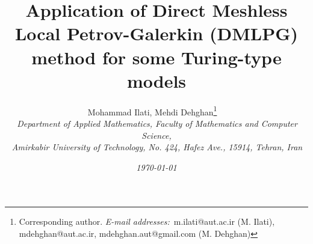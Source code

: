 \documentclass[12pt]{article}
\numberwithin{equation}{section}
\begin{document}
\date{\small\textsl{\today}}
\title{Application of Direct Meshless Local Petrov-Galerkin (DMLPG) method for some Turing-type models}
\author{
 \large Mohammad Ilati, \large Mehdi Dehghan\footnote{Corresponding author.  {\em E-mail addresses:}\
m.ilati@aut.ac.ir (M. Ilati), mdehghan@aut.ac.ir, mdehghan.aut@gmail.com (M. Dehghan)
}   \,  $^{\mbox{\small \em }}$ \\
\small{\em $^{\mbox{\footnotesize }}$\em  Department of Applied Mathematics, Faculty of Mathematics and Computer Science,}\vspace{-1mm}\\
 \small{\em $^{\mbox{\footnotesize }}$\em  Amirkabir University of Technology, No. 424,
Hafez Ave., 15914, Tehran, Iran}\vspace{-1mm}\\
} \maketitle
\vspace{.9cm} %
\end{document}
